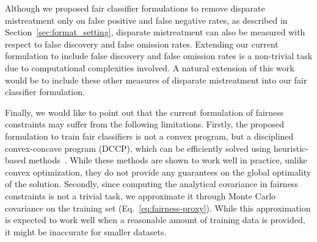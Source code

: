 \documentclass[letterpaper]{sig-alternate-2013}
\newcommand{\disc}{disparate mistreatment}
\begin{document}
Although we proposed fair classifier formulations to remove \disc{} only on false positive and false negative rates, as described in Section~\ref{sec:format_setting}, \disc{} can also be measured with respect to false discovery and false omission rates.
Extending our current formulation to include false discovery and false omission rates is a non-trivial task due to computational complexities involved.
A natural extension of this work would be to include these other measures of \disc{} into our fair classifier formulation.




Finally, we
would like to point out that the current formulation of fairness constraints may suffer from the following limitations.
Firstly, the proposed formulation to train fair classifiers is not a convex program, but a disciplined convex-concave program (DCCP), which can be efficiently solved using heuristic-based methods~\cite{boyd_concave_convex}.  While these methods are shown
to work well in practice, unlike convex optimization, they do not provide any guarantees on the global optimality of the solution.
Secondly, since com\-pu\-ting the analytical covariance in fairness constraints is not a trivial task, we approximate it through Monte Carlo covariance on the training set (Eq.~\ref{eq:fairness-proxy}). While this approximation is expected to work well when a reasonable amount of training data is provided, it might be inaccurate for smaller datasets.
\end{document}

